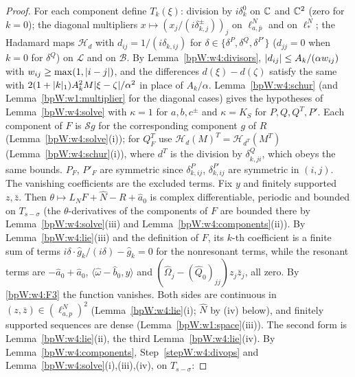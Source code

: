 \begin{proof}
\label{stepW:w4:divops}
For each component define $T_k(\xi)$: division by $i\delta^0_k$ on $\mathbb{C}$ and $\mathbb{C}^2$ (zero for $k=0$); the diagonal
multipliers $x\mapsto(x_j/(i\delta^\pm_{k,j}))_j$ on $\ell^N_{a,\bar p}$ and on $\ell^N_*$; the Hadamard maps
$\mathcal H_d$ with $d_{ij}=1/(i\delta_{k,ij})$ for $\delta\in\{\delta^P,\delta^Q,\delta^{P'}\}$ ($d_{jj}=0$ when $k=0$ for
$\delta^Q$) on $\mathcal L$ and on $\mathcal B$. By Lemma~\ref{bpW:w4:divisors}, $\lvert d_{ij}\rvert\le A_k/(\alpha w_{ij})$ with
$w_{ij}\ge\max(1,\lvert i-j\rvert)$, and the differences $d(\xi)-d(\zeta)$ satisfy the same with
$2(1+\lvert k\rvert_1)A_k^2M\lvert \xi-\zeta\rvert/\alpha^2$ in place of $A_k/\alpha$. Lemma~\ref{bpW:w4:schur} (and
Lemma~\ref{bpW:w1:multiplier} for the diagonal cases) gives the hypotheses of Lemma~\ref{bpW:w4:solve} with $\kappa=1$
for $a,b,c^\pm$ and $\kappa=K_S$ for $P,Q,Q^T,P'$.
\label{stepW:w4:class}
Each component of $F$ is $\mathcal Sg$ for the corresponding component $g$ of $R$ (Lemma~\ref{bpW:w4:solve}(i)); for
$Q_F^T$ use $\mathcal H_d(M)^T=\mathcal H_{d^T}(M^T)$ (Lemma~\ref{bpW:w4:schur}(i)), where $d^T$ is the division by
$\delta^Q_{k,ji}$, which obeys the same bounds. $P_F$, $P'_F$ are symmetric since $\delta^P_{k,ij}$, $\delta^{P'}_{k,ij}$ are
symmetric in $(i,j)$. The vanishing coefficients are the excluded terms.
\label{stepW:w4:equation}
Fix $y$ and finitely supported $z,\bar z$. Then $\theta\mapsto L_NF+\hat N-R+\hat a_0$ is complex differentiable,
periodic and bounded on $T_{s-\sigma}$ (the $\theta$-derivatives of the components of $F$ are bounded there by
Lemma~\ref{bpW:w4:solve}(iii) and Lemma~\ref{bpW:w4:components}(ii)). By Lemma~\ref{bpW:w4:lie}(iii) and the
definition of $F$, its $k$-th coefficient is a finite sum of terms $i\delta\cdot\hat g_k/(i\delta)-\hat g_k=0$ for the
nonresonant terms, while the resonant terms are $-\hat a_0+\hat a_0$, $\langle\hat\omega-\hat b_0,y\rangle$ and
$(\hat\Omega_j-(\hat Q_0)_{jj})z_j\bar z_j$, all zero. By \ref{bpW:w4:F3} the function vanishes. Both sides are
continuous in $(z,\bar z)\in(\ell^N_{a,p})^2$ (Lemma~\ref{bpW:w4:lie}(i); $\hat N$ by (iv) below), and finitely
supported sequences are dense (Lemma~\ref{bpW:w1:space}(iii)). The second form is Lemma~\ref{bpW:w4:lie}(ii), the third
Lemma~\ref{bpW:w4:lie}(iv).
\label{stepW:w4:Fcomp}
By Lemma~\ref{bpW:w4:components}, Step~\ref{stepW:w4:divops} and Lemma~\ref{bpW:w4:solve}(i),(iii),(iv), on $T_{s-\sigma}$:

\end{proof}
